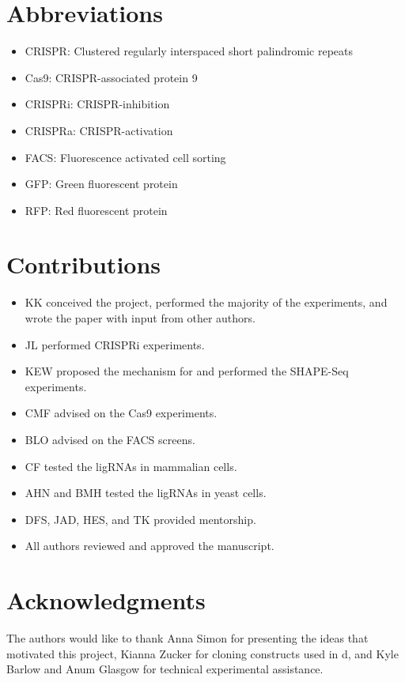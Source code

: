 \documentclass[10pt,oneside]{article}
\begin{document}
\section{Abbreviations}

\begin{itemize}
    \item CRISPR: Clustered regularly interspaced short palindromic repeats
    \item Cas9: CRISPR-associated protein 9
    \item CRISPRi: CRISPR-inhibition
    \item CRISPRa: CRISPR-activation
    \item FACS: Fluorescence activated cell sorting
    \item GFP: Green fluorescent protein
    \item RFP: Red fluorescent protein
\end{itemize}

\section{Contributions}

\begin{itemize}
    \item KK conceived the project, performed the majority of the experiments, and wrote the paper with input from other authors.
    \item JL performed CRISPRi experiments.
    \item KEW proposed the mechanism for \ligrnaB{} and performed the SHAPE-Seq experiments.
    \item CMF advised on the \invitro{} Cas9 experiments.
    \item BLO advised on the FACS screens.
    \item CF tested the ligRNAs in mammalian cells.
    \item AHN and BMH tested the ligRNAs in yeast cells.
    \item DFS, JAD, HES, and TK provided mentorship.
	\item All authors reviewed and approved the manuscript. 
\end{itemize}

\section{Acknowledgments}

The authors would like to thank Anna Simon for presenting the ideas that motivated this project, Kianna Zucker for cloning constructs used in d, and Kyle Barlow and Anum Glasgow for technical experimental assistance.  
\end{document}

